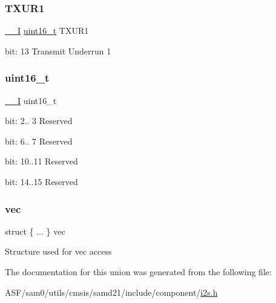 \subsubsection{\texorpdfstring{TXUR1}{TXUR1}}
{\footnotesize\ttfamily \mbox{\hyperlink{core__cm0plus_8h_af63697ed9952cc71e1225efe205f6cd3}{\+\_\+\+\_\+I}} \mbox{\hyperlink{union_i2_s___i_n_t_f_l_a_g___type_a25e8fd3335b0c4872c6e2910bd01f0f6}{uint16\+\_\+t}} T\+X\+U\+R1}

bit\+: 13 Transmit Underrun 1 \mbox{\label{union_i2_s___i_n_t_f_l_a_g___type_a25e8fd3335b0c4872c6e2910bd01f0f6}} 
\subsubsection{\texorpdfstring{uint16\_t}{uint16\_t}}
{\footnotesize\ttfamily \mbox{\hyperlink{core__cm0plus_8h_af63697ed9952cc71e1225efe205f6cd3}{\+\_\+\+\_\+I}} uint16\+\_\+t}

bit\+: 2.. 3 Reserved

bit\+: 6.. 7 Reserved

bit\+: 10..11 Reserved

bit\+: 14..15 Reserved \mbox{\label{union_i2_s___i_n_t_f_l_a_g___type_a759541c30ffb0a326338bff080d18dd7}} 
\subsubsection{\texorpdfstring{vec}{vec}}
{\footnotesize\ttfamily struct \{ ... \}   vec}

Structure used for vec access 

The documentation for this union was generated from the following file\+:\begin{DoxyCompactItemize}
\item 
A\+S\+F/sam0/utils/cmsis/samd21/include/component/\mbox{\hyperlink{component_2i2s_8h}{i2s.\+h}}\end{DoxyCompactItemize}
